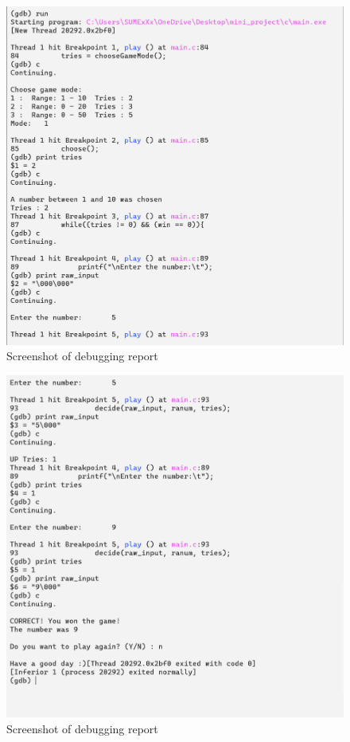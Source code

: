 \documentclass{report}
\begin{document}
\begin{figure}[H]
  \includegraphics[width=\linewidth]{pic2.png}
  \caption{Screenshot of debugging report}
  \label{Debug picture 2}
\end{figure}

\begin{figure}[H]
  \includegraphics[width=\linewidth]{pic3.png}
  \caption{Screenshot of debugging report}
  \label{Debug picture 3}
\end{figure}
\end{document}
